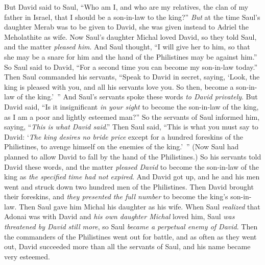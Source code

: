 \begin{biblechapter}
\verse But David said to Saul, “Who am I, and who are my relatives, the clan of my father in Israel, that I should be a son-in-law to the king?”
\verse \textit{But} at the time Saul’s daughter Merab was to be given to David, she was given instead to Adriel the Meholathite as wife.
\verse Now Saul’s daughter Michal loved David, so they told Saul, and the matter \textit{pleased him}.
\verse And Saul thought, “I will give her to him, so that she may be a snare for him and the hand of the Philistines may be against him.” So Saul said to David, “For a second time you can become my son-in-law today.”
\verse Then Saul commanded his servants, “Speak to David in secret, saying, ‘Look, the king is pleased with you, and all his servants love you. So then, become a son-in-law of the king.’ ”
\verse And Saul’s servants spoke these words \textit{to David privately}. But David said, “Is it insignificant \textit{in your sight} to become the son-in-law of the king, as I am a poor and lightly esteemed man?”
\verse So the servants of Saul informed him, saying, “\textit{This is what David said}.”
\verse Then Saul said, “This is what you must say to David: ‘\textit{The king desires no bride price} except for a hundred foreskins of the Philistines, to avenge himself on the enemies of the king.’ ” (Now Saul had planned to allow David to fall by the hand of the Philistines.)
\verse So his servants told David these words, and the matter \textit{pleased David} to become the son-in-law of the king as \textit{the specified time had not expired}.
\verse And David got up, and he and his men went and struck down two hundred men of the Philistines. Then David brought their foreskins, and \textit{they presented the full number} to become the king’s son-in-law. Then Saul gave him Michal his daughter as his wife.
\verse When Saul \textit{realized} that Adonai was with David and \textit{his own daughter Michal} loved him,
\verse Saul \textit{was threatened by David still more}, so Saul \textit{became a perpetual enemy of David}.
\verse Then the commanders of the Philistines went out for battle, and as often as they went out, David succeeded more than all the servants of Saul, and his name became very esteemed.
\end{biblechapter}

